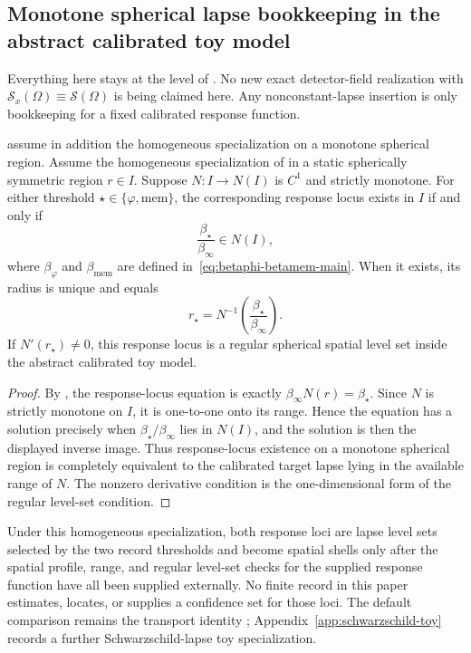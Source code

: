 \subsection{Monotone spherical lapse bookkeeping in the abstract calibrated toy model}

Everything here stays at the level of
. No new exact
detector-field realization with
$\mathcal S_x(\Omega)\equiv\mathcal S(\Omega)$ is being claimed here.
Any nonconstant-lapse insertion is only bookkeeping for a fixed calibrated
response function.

\begin{proposition}\label{prop:existence-main}
\ResponseStandingClause assume in addition the homogeneous
specialization on a monotone spherical region.
Assume the homogeneous specialization of  in a static
spherically symmetric region $r\in I$. Suppose
$N:I\to N(I)$ is $C^1$ and strictly monotone. For either threshold
$\star\in\{\varphi,\mathrm{mem}\}$, the corresponding response locus exists in $I$ if
and only if
\[
\frac{\beta_\star}{\beta_\infty}\in N(I),
\]
where $\beta_\varphi$ and $\beta_{\mathrm{mem}}$ are defined in~\eqref{eq:betaphi-betamem-main}. When it exists, its radius is unique and equals
\[
r_\star=N^{-1}\!\left(\frac{\beta_\star}{\beta_\infty}\right).
\]
If $N'(r_\star)\neq0$, this response locus is a regular spherical spatial
level set inside the abstract calibrated toy model.
\end{proposition}

\begin{proof}
By , the response-locus equation is exactly
$\beta_\infty N(r)=\beta_\star$. Since $N$ is strictly monotone on $I$, it is
one-to-one onto its range. Hence the equation has a solution precisely when
$\beta_\star/\beta_\infty$ lies in $N(I)$, and the solution is then the
displayed inverse image. Thus response-locus existence on a monotone spherical region is
completely equivalent to the calibrated target lapse lying in the available
range of $N$. The nonzero derivative condition is the one-dimensional form of
the regular level-set condition.
\end{proof}

Under this homogeneous specialization, both response loci are lapse level sets
selected by the two record thresholds and become spatial shells only after the
spatial profile, range, and regular level-set checks for the supplied response
function have all been supplied externally.  No finite record in this paper
estimates, locates, or supplies a confidence set for those loci. The default
comparison remains the transport identity
; Appendix~\ref{app:schwarzschild-toy}
records a further Schwarzschild-lapse toy specialization.

